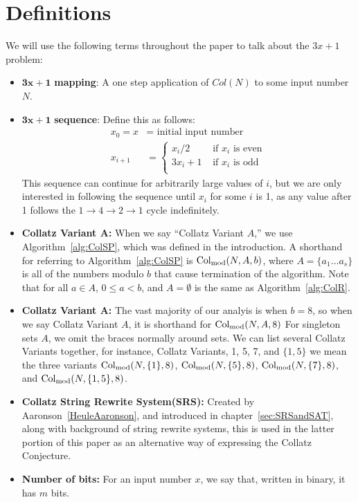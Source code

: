 \chapter{Definitions} \label{sec:defns}
We will use the following terms throughout the paper to talk about the $3x+1$ problem:
\begin{itemize}
    \item $\boldsymbol{3x+1}$\textbf{ mapping}: A one step application of $Col(N)$ to some input number $N$.
    \item $\boldsymbol{3x+1}$\textbf{ sequence}: Define this as follows: 
    \begin{align*}
        x_0 = x &= \text{ initial input number} \\
        x_{i+1} &= \begin{cases} 
        x_{i}/2 &\text{ if $x_i$ is even} \\
        3 x_{i} + 1 &\text{ if $x_i$ is odd} \\
        \end{cases}
    \end{align*}
    This sequence can continue for arbitrarily large values of $i$, but we are only interested in following the sequence until $x_i$ for some $i$ is 1, as any value after 1 follows the $1 \rightarrow 4 \rightarrow 2 \rightarrow 1$ cycle indefinitely.
    \item \textbf{Collatz Variant $\boldsymbol A$:} When we say ``Collatz Variant $A$,'' we use Algorithm~\ref{alg:ColSP}, which was defined in the introduction. A shorthand for referring to Algorithm~\ref{alg:ColSP} is $\mathrm{Col}_{\text{mod}}(N,A,b)$, where $A = \{a_1 \ldots a_s\}$ is all of the numbers modulo $b$ that cause termination of the algorithm. Note that for all $a \in A$, $0 \le a < b$, and $A = \emptyset$ is the same as Algorithm~\ref{alg:ColR}.
    \item \textbf{Collatz Variant A:} The vast majority of our analyis is when $b = 8$, so when we say Collatz Variant $A$, it is shorthand for $\mathrm{Col}_{\text{mod}}(N,A,8)$  For singleton sets $A$, we omit the braces normally around sets. We can list several Collatz Variants together, for instance, Collatz Variants, 1, 5, 7, and $\{1,5\}$ we mean the three variants $\mathrm{Col}_{\text{mod}}(N,\{1\},8)$, $\mathrm{Col}_{\text{mod}}(N,\{5\},8)$, $\mathrm{Col}_{\text{mod}}(N,\{7\},8)$, and $\mathrm{Col}_{\text{mod}}(N,\{1,5\},8)$.
    \item \textbf{Collatz String Rewrite System(SRS):} Created by Aaronson~\ref{HeuleAaronson}, and introduced in chapter~\ref{sec:SRSandSAT}, along with background of string rewrite systems, this is used in the latter portion of this paper as an alternative way of expressing the Collatz Conjecture.
    \item \textbf{Number of bits:} For an input number $x$, we say that, written in binary, it has $m$ bits.
\end{itemize}
